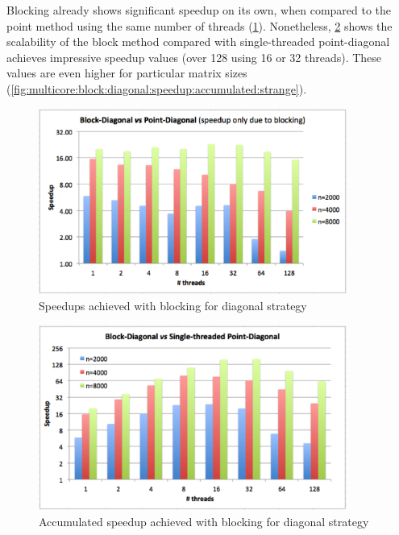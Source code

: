 \documentclass[../thesis]{subfiles}
\begin{document}
	Blocking already shows significant speedup on its own, when compared to the point method using the same number of threads (\cref{fig:multicore:block:diagonal:speedup}). Nonetheless, \cref{fig:multicore:block:diagonal:speedup:accumulated} shows the scalability of the block method compared with single-threaded point-diagonal achieves impressive speedup values (over 128 using 16 or 32 threads). These values are even higher for particular matrix sizes (\cref{fig:multicore:block:diagonal:speedup:accumulated:strange}).

	\begin{figure}[hp]
		\begin{center}
			\includegraphics[width=0.9\textwidth]{assets/images/multicore/diagonal-speedup.png}
		\end{center}
		\caption{Speedups achieved with blocking for diagonal strategy}
		\label{fig:multicore:block:diagonal:speedup}
	\end{figure}

	\begin{figure}[hp]
		\begin{center}
			\includegraphics[width=0.9\textwidth]{assets/images/multicore/diagonal-block-stpoint-speedup.png}
		\end{center}
		\caption{Accumulated speedup achieved with blocking for diagonal strategy}
		\label{fig:multicore:block:diagonal:speedup:accumulated}
	\end{figure}
\end{document}
